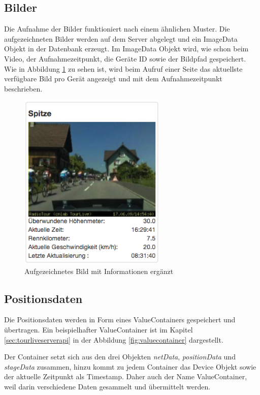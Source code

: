 \subsection{Bilder}
Die Aufnahme der Bilder funktioniert nach einem ähnlichen Muster. Die aufgezeichneten Bilder werden auf dem Server abgelegt und ein ImageData Objekt in der Datenbank erzeugt. Im ImageData Objekt wird, wie schon beim Video, der Aufnahmezeitpunkt, die Geräte ID sowie der Bildpfad gespeichert. Wie in Abbildung \ref{fig:bildaufzeichnung} zu sehen ist, wird beim Aufruf einer Seite das aktuellste verfügbare Bild pro Gerät angezeigt und mit dem Aufnahmezeitpunkt beschrieben.
\begin{figure}[H]
	\centering
	\includegraphics[width=70mm]{images/tourliveweb/bildaufzeichnung.png}
	\caption{Aufgezeichnetes Bild mit Informationen ergänzt}
	\label{fig:bildaufzeichnung}
\end{figure}

\subsection{Positionsdaten}
Die Positionsdaten werden in Form eines ValueContainers gespeichert und übertragen. Ein beispielhafter ValueContainer ist im Kapitel \ref{sec:tourliveserverapi} in der Abbildung \ref{fig:valuecontainer} dargestellt.

Der Container setzt sich aus den drei Objekten \textit{netData}, \textit{positionData} und \textit{stageData} zusammen, hinzu kommt zu jedem Container das Device Objekt sowie der aktuelle Zeitpunkt als Timestamp. Daher auch der Name ValueContainer, weil darin verschiedene Daten gesammelt und übermittelt werden.
\\


